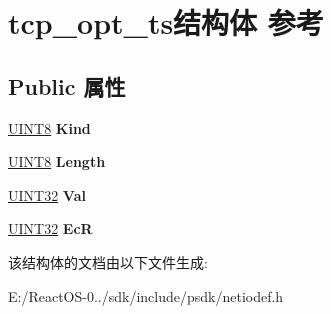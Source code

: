 \hypertarget{structtcp__opt__ts}{}\section{tcp\+\_\+opt\+\_\+ts结构体 参考}
\label{structtcp__opt__ts}
\subsection*{Public 属性}
\begin{DoxyCompactItemize}
\item 
\mbox{\label{structtcp__opt__ts_aae983e1b64fee67267d8c8e26ab3f737}} 
\hyperlink{_processor_bind_8h_ab27e9918b538ce9d8ca692479b375b6a}{U\+I\+N\+T8} {\bfseries Kind}
\item 
\mbox{\label{structtcp__opt__ts_a43ea2d338a3eb63bd50c201a269462f2}} 
\hyperlink{_processor_bind_8h_ab27e9918b538ce9d8ca692479b375b6a}{U\+I\+N\+T8} {\bfseries Length}
\item 
\mbox{\label{structtcp__opt__ts_adefdd5c7c90389a91ef4f6d017122525}} 
\hyperlink{_processor_bind_8h_ae1e6edbbc26d6fbc71a90190d0266018}{U\+I\+N\+T32} {\bfseries Val}
\item 
\mbox{\label{structtcp__opt__ts_acfe5bcf250069b987989c6b74198c9e1}} 
\hyperlink{_processor_bind_8h_ae1e6edbbc26d6fbc71a90190d0266018}{U\+I\+N\+T32} {\bfseries EcR}
\end{DoxyCompactItemize}


该结构体的文档由以下文件生成\+:\begin{DoxyCompactItemize}
\item 
E\+:/\+React\+O\+S-\/0../sdk/include/psdk/netiodef.\+h\end{DoxyCompactItemize}
